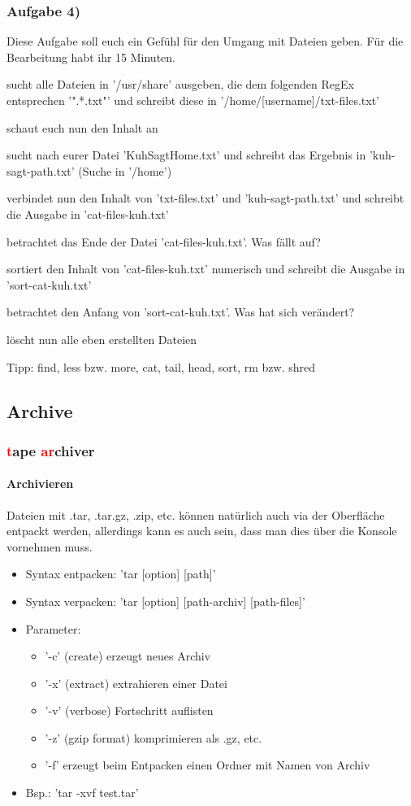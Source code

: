 \documentclass[12pt,utf8]{beamer}
\begin{document}
\begin{frame}
\frametitle{Aufgabe 4)}
Diese Aufgabe soll euch ein Gefühl für den Umgang mit Dateien geben. Für die Bearbeitung habt ihr 15 Minuten.
\begin{itemize}
	{\footnotesize
	\item sucht alle Dateien in '/usr/share' ausgeben, die dem folgenden RegEx entsprechen '".*.txt"' und schreibt diese in '/home/[username]/txt-files.txt'
	\item schaut euch nun den Inhalt an
	\item sucht nach eurer Datei 'KuhSagtHome.txt' und schreibt das Ergebnis in 'kuh-sagt-path.txt' (Suche in '/home')
	\item verbindet nun den Inhalt von 'txt-files.txt' und 'kuh-sagt-path.txt' und schreibt die Ausgabe in 'cat-files-kuh.txt'
	\item betrachtet das Ende der Datei 'cat-files-kuh.txt'. Was fällt auf?
	\item sortiert den Inhalt von 'cat-files-kuh.txt' numerisch und schreibt die Ausgabe in 'sort-cat-kuh.txt'
	\item betrachtet den Anfang von 'sort-cat-kuh.txt'. Was hat sich verändert?
	\item löscht nun alle eben erstellten Dateien
	}
\end{itemize}
{\scriptsize Tipp: find, less bzw. more, cat, tail, head, sort, rm bzw. shred}
\end{frame}


\subsection{Archive}
\begin{frame}
\frametitle{\textcolor{red}{t}ape \textcolor{red}{ar}chiver}
\framesubtitle{Archivieren}
Dateien mit .tar, .tar.gz, .zip, etc. können natürlich auch via der Oberfläche entpackt werden, allerdings kann es auch sein, dass man dies über die Konsole vornehmen muss.
\begin{itemize}[<+->]
	\item Syntax entpacken: 'tar [option] [path]'
	\item Syntax verpacken: 'tar [option] [path-archiv] [path-files]'
	\item Parameter:
	\begin{itemize}[<+->]
		\item '-c' (create) erzeugt neues Archiv
		\item '-x' (extract) extrahieren einer Datei
		\item '-v' (verbose) Fortschritt auflisten
		\item '-z' (gzip format) komprimieren als .gz, etc.
		\item '-f' erzeugt beim Entpacken einen Ordner mit Namen von Archiv
	\end{itemize}
	\item Bsp.: 'tar -xvf test.tar'
\end{itemize}
\end{frame}
\end{document}
